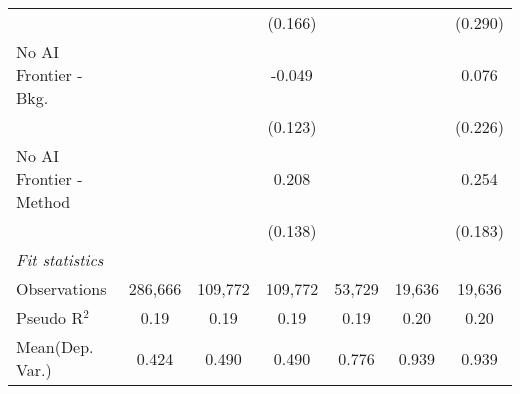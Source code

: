 \begin{tabular}{lcccccc}
                           &              &              & (0.166)      &              &         & (0.290)\\   
   No AI Frontier - Bkg.   &              &              & -0.049       &              &         & 0.076\\   
                           &              &              & (0.123)      &              &         & (0.226)\\   
   No AI Frontier - Method &              &              & 0.208        &              &         & 0.254\\   
                           &              &              & (0.138)      &              &         & (0.183)\\   
   \midrule
   \emph{Fit statistics}\\
   Observations            & 286,666      & 109,772      & 109,772      & 53,729       & 19,636  & 19,636\\  
   Pseudo R$^2$            & 0.19         & 0.19         & 0.19         & 0.19         & 0.20    & 0.20\\  
Mean(Dep. Var.) & 0.424 & 0.490 & 0.490 & 0.776 & 0.939 & 0.939 \\
   

\end{tabular}
